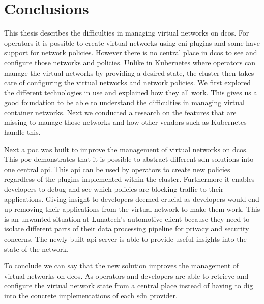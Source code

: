 \chapter{Conclusions}
\label{chap:conclusions}
This thesis describes the difficulties in managing virtual networks on \gls{dcos}. For operators it is possible to create virtual networks using \gls{cni} plugins and some have support for network policies. However there is no central place in \gls{dcos} to see and configure those networks and policies. Unlike in Kubernetes where operators can manage the virtual networks by providing a desired state, the cluster then takes care of configuring the virtual networks and network policies. We first explored the different technologies in use and explained how they all work. This gives us a good foundation to be able to understand the difficulties in managing virtual container networks. Next we conducted a research on the features that are missing to manage those networks and how other vendors such as Kubernetes handle this.

Next a \gls{poc} was built to improve the management of virtual networks on \gls{dcos}. This \gls{poc} demonstrates that it is possible to abstract different \gls{sdn} solutions into one central \gls{api}. This \gls{api} can be used by operators to create new policies regardless of the plugins implemented within the cluster. Furthermore it enables developers to debug and see which policies are blocking traffic to their applications. Giving insight to developers deemed crucial as developers would end up removing their applications from the virtual network to make them work. This is an unwanted situation at Lunatech's automotive client because they need to isolate different parts of their data processing pipeline for privacy and security concerns. The newly built api-server is able to provide useful insights into the state of the network.

To conclude we can say that the new solution improves the management of virtual networks on \gls{dcos}. As operators and developers are able to retrieve and configure the virtual network state from a central place instead of having to dig into the concrete implementations of each \gls{sdn} provider.
